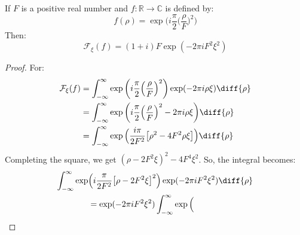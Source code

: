 \documentclass[crop=false,class=book,oneside]{standalone}
\begin{document}
            \begin{theorem}
                If $F$ is a positive real number and
                $f:\mathbb{R}\rightarrow\mathbb{C}$ is defined by:
                \begin{equation}
                    f(\rho)=
                        \exp\bigg(
                            i\frac{\pi}{2}
                            \Big(\frac{\rho}{F}\Big)^{2}
                        \bigg)
                \end{equation}
                Then:
                \begin{equation}
                    \mathcal{F}_{\xi}(f)
                    =(1+i)F\exp(\minus{2}\pi{i}F^{2}\xi^{2})
                \end{equation}
            \end{theorem}
            \begin{proof}
            For:
            \begin{align}
                \mathcal{F}_{\xi}(f)
                &=\int_{-\infty}^{\infty}
                    \exp\bigg(
                        i\frac{\pi}{2}
                        \Big(\frac{\rho}{F}\Big)^{2}
                    \bigg)
                    \exp(-2\pi{i}\rho\xi)\diff{\rho}\\
                &=\int_{-\infty}^{\infty}
                    \exp\bigg(
                        i\frac{\pi}{2}\Big(
                            \frac{\rho}{F}
                        \Big)^{2}-2\pi{i}\rho\xi
                    \bigg)
                    \diff{\rho}\\
                &=\int_{-\infty}^{\infty}
                    \exp\Big(
                        \frac{i\pi}{2F^2}
                        \big[\rho^2-4F^2\rho \xi\big]
                    \Big)\diff{\rho}
            \end{align}
            Completing the square, we get
            $(\rho-2F^{2}\xi)^{2}-4F^{4}\xi^{2}$.
            So, the integral becomes:
            \begin{equation}
                \begin{split}
                    \int_{-\infty}^{\infty}
                    \exp&\Big(
                        i\frac{\pi}{2F^2}
                        \big[\rho-2F^{2}\xi\big]^{2}
                    \Big)
                    \exp(-2\pi{i}F^{2}\xi^{2})\diff{\rho}\\
                    &=\exp(-2\pi{i}F^{2}\xi^{2})
                    \int_{-\infty}^{\infty}
                    \exp\Big(

\end{split}
\end{equation}
\end{proof}
\end{document}
